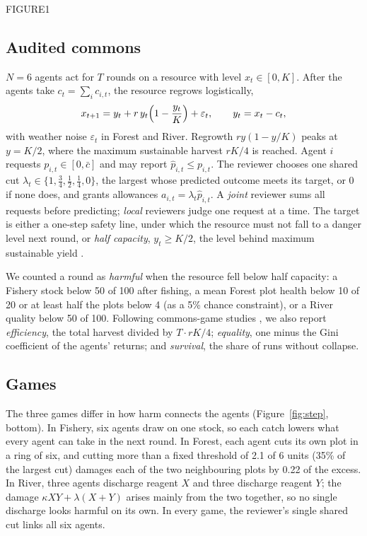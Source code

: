 FIGURE1

\subsection{Audited commons}

$N=6$ agents act for $T$ rounds on a resource with level $x_t\in[0,K]$. After the agents take $c_t=\sum_i c_{i,t}$, the resource regrows logistically,
\begin{equation}
x_{t+1} = y_t + r\,y_t\Bigl(1-\frac{y_t}{K}\Bigr) + \varepsilon_t,\qquad y_t = x_t - c_t,
\label{eq:dyn}
\end{equation}
with weather noise $\varepsilon_t$ in Forest and River. Regrowth $r y(1-y/K)$ peaks at $y=K/2$, where the maximum sustainable harvest $rK/4$ is reached. Agent $i$ requests $p_{i,t}\in[0,\bar c]$ and may report $\hat p_{i,t}\le p_{i,t}$. The reviewer chooses one shared cut $\lambda_t\in\{1,\tfrac34,\tfrac12,\tfrac14,0\}$, the largest whose predicted outcome meets its target, or 0 if none does, and grants allowances $a_{i,t}=\lambda_t\hat p_{i,t}$. A \emph{joint} reviewer sums all requests before predicting; \emph{local} reviewers judge one request at a time. The target is either a one-step safety line, under which the resource must not fall to a danger level next round, or \emph{half capacity}, $y_t\ge K/2$, the level behind maximum sustainable yield \citep{may1978exploiting}.

We counted a round as \emph{harmful} when the resource fell below half capacity: a Fishery stock below 50 of 100 after fishing, a mean Forest plot health below 10 of 20 or at least half the plots below 4 (as a 5\% chance constraint), or a River quality below 50 of 100. Following commons-game studies \citep{piatti2024cooperate,perolat2017multiagent}, we also report \emph{efficiency}, the total harvest divided by $T\cdot rK/4$; \emph{equality}, one minus the Gini coefficient of the agents' returns; and \emph{survival}, the share of runs without collapse.

\subsection{Games}

The three games differ in how harm connects the agents (Figure~\ref{fig:step}, bottom). In Fishery, six agents draw on one stock, so each catch lowers what every agent can take in the next round. In Forest, each agent cuts its own plot in a ring of six, and cutting more than a fixed threshold of 2.1 of 6 units (35\% of the largest cut) damages each of the two neighbouring plots by 0.22 of the excess. In River, three agents discharge reagent $X$ and three discharge reagent $Y$; the damage $\kappa XY+\lambda(X+Y)$ arises mainly from the two together, so no single discharge looks harmful on its own. In every game, the reviewer's single shared cut links all six agents.

